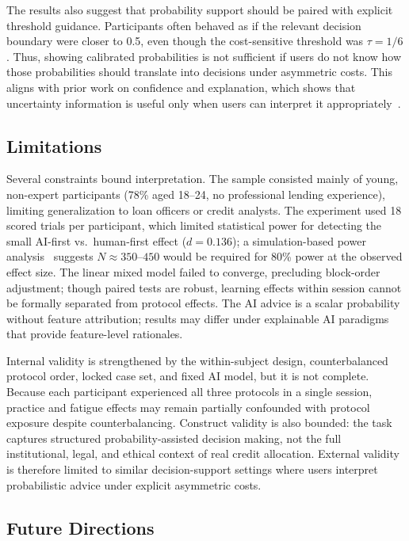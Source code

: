 \documentclass[conference]{IEEEtran}
\begin{document}
The results also suggest that probability support should be paired with
explicit threshold guidance. Participants often behaved as if the relevant
decision boundary were closer to 0.5, even though the cost-sensitive
threshold was $\tau = 1/6$. Thus, showing calibrated probabilities is not
sufficient if users do not know how those probabilities should translate
into decisions under asymmetric costs. This aligns with prior work on
confidence and explanation, which shows that uncertainty information is
useful only when users can interpret it appropriately~\cite{zhang2020effect}.


\subsection{Limitations}

Several constraints bound interpretation. The sample consisted mainly of
young, non-expert participants (78\% aged 18--24, no professional lending
experience), limiting generalization to loan officers or credit analysts.
The experiment used 18 scored trials per participant, which limited
statistical power for detecting the small AI-first vs.\ human-first
effect ($d = 0.136$); a simulation-based power analysis~\cite{green2016simr}
suggests $N \approx 350$--$450$ would be required for 80\% power at the
observed effect size. The linear mixed model failed to converge, precluding
block-order adjustment; though paired tests are robust, learning effects
within session cannot be formally separated from protocol effects. The AI
advice is a scalar probability without feature attribution; results may
differ under explainable AI paradigms~\cite{zhang2020effect} that provide
feature-level rationales.

Internal validity is strengthened by the within-subject design,
counterbalanced protocol order, locked case set, and fixed AI model, but
it is not complete. Because each participant experienced all three
protocols in a single session, practice and fatigue effects may remain
partially confounded with protocol exposure despite counterbalancing.
Construct validity is also bounded: the task captures structured
probability-assisted decision making, not the full institutional, legal,
and ethical context of real credit allocation. External validity is
therefore limited to similar decision-support settings where users
interpret probabilistic advice under explicit asymmetric costs.

\subsection{Future Directions}
\end{document}
